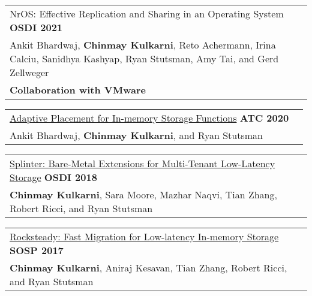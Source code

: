 \documentclass[margin,line]{res}
\begin{document}
\begin{resume}
 \vspace{-7pt}
 \begin{tabular}{@{}p{5.5in}p{4in}}
 NrOS: Effective Replication and Sharing in an Operating System \hfill
 {\small\bf OSDI 2021}\\
 {\small Ankit Bhardwaj, {\bf Chinmay Kulkarni}, Reto Achermann, Irina
  Calciu, Sanidhya Kashyap, Ryan Stutsman, Amy Tai, and Gerd Zellweger}\\
 {\small\bf Collaboration with VMware}\\
 \end{tabular}

 \vspace{-7pt}
 \begin{tabular}{@{}p{5.5in}p{4in}}
 \href{http://utah.systems/projects/kulkarni\_splinter}{Adaptive
 Placement for In-memory Storage Functions} \hfill
 {\small\bf ATC 2020}\\
 {\small Ankit Bhardwaj, {\bf Chinmay Kulkarni}, and Ryan Stutsman}\\
 \end{tabular}

 \vspace{-7pt}
 \begin{tabular}{@{}p{5.5in}p{4in}}
 \href{http://utah.systems/projects/kulkarni\_splinter}{Splinter:
 Bare-Metal Extensions for Multi-Tenant Low-Latency Storage} \hfill
 {\small\bf OSDI 2018}\\
 {\small{\bf Chinmay Kulkarni}, Sara Moore, Mazhar Naqvi, Tian Zhang, Robert
 Ricci, and Ryan Stutsman}\\
 \end{tabular}

 \vspace{-7pt}
 \begin{tabular}{@{}p{5.5in}p{4in}}
 \href{http://utah.systems/projects/kulkarni\_rocksteady}{Rocksteady: Fast
 Migration for Low-latency In-memory Storage} \hfill
 {\small\bf SOSP 2017}\\
 {\small{\bf Chinmay Kulkarni}, Aniraj Kesavan, Tian Zhang, Robert
 Ricci, and Ryan Stutsman}\\
 \end{tabular}



\end{resume}
\end{document}
